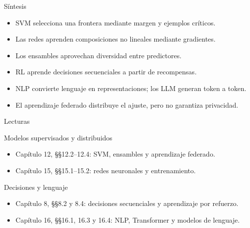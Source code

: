 \documentclass[aspectratio=169,10pt]{beamer}
\begin{document}
\begin{frame}{Síntesis}
  \small
  \begin{itemize}
    \item SVM selecciona una frontera mediante margen y ejemplos críticos.
    \item Las redes aprenden composiciones no lineales mediante gradientes.
    \item Los ensambles aprovechan diversidad entre predictores.
    \item RL aprende decisiones secuenciales a partir de recompensas.
    \item NLP convierte lenguaje en representaciones; los LLM generan token a token.
    \item El aprendizaje federado distribuye el ajuste, pero no garantiza privacidad.
  \end{itemize}
\end{frame}

\begin{frame}{Lecturas}
  \small
  \begin{block}{Modelos supervisados y distribuidos}
    \begin{itemize}
      \item Capítulo 12, §§12.2--12.4: SVM, ensambles y aprendizaje federado.
      \item Capítulo 15, §§15.1--15.2: redes neuronales y entrenamiento.
    \end{itemize}
  \end{block}
  \begin{block}{Decisiones y lenguaje}
    \begin{itemize}
      \item Capítulo 8, §§8.2 y 8.4: decisiones secuenciales y aprendizaje por refuerzo.
      \item Capítulo 16, §§16.1, 16.3 y 16.4: NLP, Transformer y modelos de lenguaje.
    \end{itemize}
  \end{block}
\end{frame}
\end{document}
